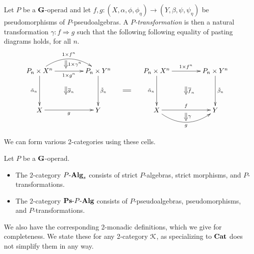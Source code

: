 \begin{Defi}
Let $P$ be a $\mathbf{G}$-operad and let $f, g \colon (X, \alpha, \phi, \phi_\eta) \rightarrow (Y, \beta, \psi, \psi_\eta)$ be pseudomorphisms of $P$-pseudoalgebras. A \textit{$P$-transformation} is then a natural transformation $\gamma \colon f \Rightarrow g$ such that the following following equality of pasting diagrams holds, for all $n$.
    \[
        \xy
            (0,0)*+{P_n \times X^n}="00";
            (30,0)*+{P_n \times Y^n}="10";
            (0,-20)*+{X}="01";
            (30,-20)*+{Y}="11";
            {\ar@/^1.5pc/^{1 \times f^n} "00" ; "10"};
            {\ar_{1 \times g^n} "00" ; "10"};
            {\ar^{\tilde{\beta}_n} "10" ; "11"};
            {\ar_{\tilde{\alpha}_n} "00" ; "01"};
            {\ar_{g} "01" ; "11"};
            {\ar@{=>}^{1 \times \gamma^n} (13.5,5.5) ; (13.5,1.5)};
            {\ar@{=>}^{\overline{g}_n} (13.5,-8) ; (13.5,-12)};
            (60,0)*+{P_n \times X^n}="x00";
            (90,0)*+{P_n \times Y^n}="x10";
            (60,-20)*+{X}="x01";
            (90,-20)*+{Y}="x11";
            {\ar^{1 \times f^n} "x00" ; "x10"};
            {\ar^{\tilde{\beta}_n} "x10" ; "x11"};
            {\ar_{\tilde{\alpha}_n} "x00" ; "x01"};
            {\ar^{f} "x01" ; "x11"};
            {\ar@/_1.5pc/_{g} "x01" ; "x11"};
            {\ar@{=>}^{\gamma} (75,-21.5) ; (75,-25.5)};
            {\ar@{=>}^{\overline{f}_n} (75,-8) ; (75,-12)};
            {\ar@{=} (42.75,-10) ; (46.75,-10)};
        \endxy
    \]
\end{Defi}

We can form various 2-categories using these cells.

\begin{Defi}
Let $P$ be a $\mathbf{G}$-operad.
\begin{itemize}
\item The $2$-category $P\mbox{-}\mathbf{Alg}_{s}$ consists of strict $P$-algebras, strict morphisms, and $P$-transformations.
\item The $2$-category $\mathbf{Ps}\mbox{-}P\mbox{-}\mathbf{Alg}$ consists of $P$-pseudoalgebras, pseudomorphisms, and $P$-transformations.
\end{itemize}
\end{Defi}

We also have the corresponding 2-monadic definitions, which we give for completeness.  We state these for any 2-category $\mathcal{K}$, as specializing to $\mathbf{Cat}$ does not simplify them in any way.

